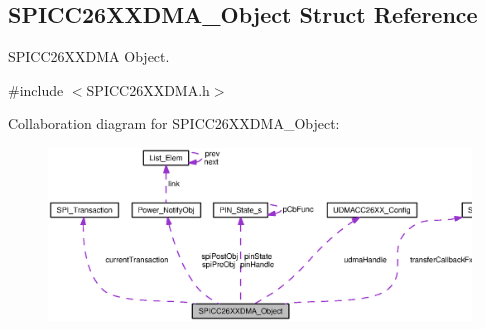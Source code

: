 \subsection{S\+P\+I\+C\+C26\+X\+X\+D\+M\+A\+\_\+\+Object Struct Reference}
\label{struct_s_p_i_c_c26_x_x_d_m_a___object}


S\+P\+I\+C\+C26\+X\+X\+D\+M\+A Object.  




{\ttfamily \#include $<$S\+P\+I\+C\+C26\+X\+X\+D\+M\+A.\+h$>$}



Collaboration diagram for S\+P\+I\+C\+C26\+X\+X\+D\+M\+A\+\_\+\+Object\+:
\nopagebreak
\begin{figure}[H]
\begin{center}
\leavevmode
\includegraphics[width=350pt]{struct_s_p_i_c_c26_x_x_d_m_a___object__coll__graph}
\end{center}
\end{figure}
